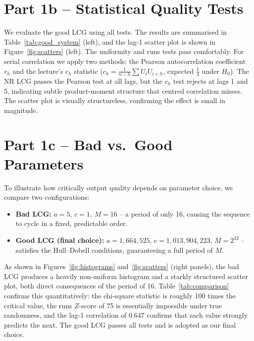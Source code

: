 \section*{Part 1b -- Statistical Quality Tests}

We evaluate the good LCG using all tests. The results are summarised in
Table~\ref{tab:good_system} (left), and the lag-1 scatter plot is shown in
Figure~\ref{fig:scatters} (left). The uniformity and runs tests pass
comfortably. For serial correlation we apply two methods: the Pearson
autocorrelation coefficient $r_h$ and the lecture's $c_h$ statistic
($c_h = \frac{1}{n-h}\sum U_i U_{i+h}$, expected $\tfrac{1}{4}$ under
$H_0$). The NR LCG passes the Pearson test at all lags, but the $c_h$ test
rejects at lags 1 and 5, indicating subtle product-moment structure that
centred correlation misses. The scatter plot is visually structureless,
confirming the effect is small in magnitude.

\section*{Part 1c -- Bad vs.\ Good Parameters}

To illustrate how critically output quality depends on parameter choice, we
compare two configurations:
\begin{itemize}
    \item \textbf{Bad LCG:} $a = 5$, $c = 1$, $M = 16$ -- a period of only
          16, causing the sequence to cycle in a fixed, predictable order.
    \item \textbf{Good LCG (final choice):} $a = 1{,}664{,}525$,
          $c = 1{,}013{,}904{,}223$, $M = 2^{32}$ -- satisfies the
          Hull--Dobell conditions, guaranteeing a full period of $M$.
\end{itemize}

As shown in Figures~\ref{fig:histograms} and~\ref{fig:scatters} (right
panels), the bad LCG produces a heavily non-uniform histogram and a starkly
structured scatter plot, both direct consequences of the period of 16.
Table~\ref{tab:comparison} confirms this quantitatively: the chi-square
statistic is roughly 100 times the critical value, the runs $Z$-score of 75
is essentially impossible under true randomness, and the lag-1 correlation
of 0.647 confirms that each value strongly predicts the next. The good LCG
passes all tests and is adopted as our final choice.

